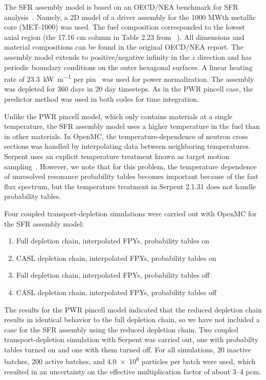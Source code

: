 \documentclass[3p,authoryear]{elsarticle}
\begin{document}
The SFR assembly model is based on an OECD/NEA benchmark for SFR
analysis~\citep{nsc2015}. Namely, a 2D model of a driver assembly for the 1000
MWth metallic core (MET-1000) was used. The fuel composition corresponded to the
lowest axial region (the 17.16 cm column in Table 2.23 from ~\citep{nsc2015}).
All dimensions and material compositions can be found in the original OECD/NEA
report. The assembly model extends to positive/negative infinity in the $z$
direction and has periodic boundary conditions on the outer hexagonal surfaces.
A linear heating rate of \SI{23.3}{\kilo\watt\per\meter} per
pin~\citep{cahalan2007anl} was used for power normalization. The assembly was
depleted for 360 days in 20 day timesteps. As in the PWR pincell case, the
predictor method was used in both codes for time integration.

Unlike the PWR pincell model, which only contains materials at a single
temperature, the SFR assembly model uses a higher temperature in the fuel than
in other materials. In OpenMC, the temperature-dependence of neutron cross
sections was handled by interpolating data between neighboring temperatures.
Serpent uses an explicit temperature treatment known as target motion
sampling~\cite{viitanen2012nse}. However, we note that for this problem, the
temperature dependence of unresolved resonance probability tables becomes
important because of the fast flux spectrum, but the temperature treatment in
Serpent 2.1.31 does not handle probability tables.

Four coupled transport-depletion simulations were carried out with OpenMC for
the SFR assembly model:
\begin{enumerate}
  \item Full depletion chain, interpolated FPYs, probability tables on
  \item CASL depletion chain, interpolated FPYs, probability tables on
  \item Full depletion chain, interpolated FPYs, probability tables off
  \item CASL depletion chain, interpolated FPYs, probability tables off
\end{enumerate}
The results for the PWR pincell model indicated that the reduced depletion chain
results in identical behavior to the full depletion chain, so we have not
included a case for the SFR assembly using the reduced depletion chain. Two
coupled transport-depletion simulation with Serpent was carried out, one with
probabilty tables turned on and one with them turned off. For all simulations,
20 inactive batches, 200 active batches, and \num{4.0e6} particles per batch
were used, which resulted in an uncertainty on the effective multiplication
factor of about 3--4 pcm.
\end{document}
